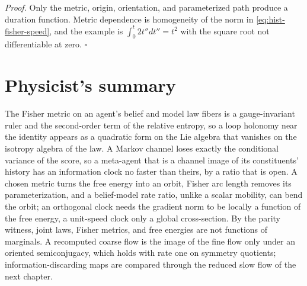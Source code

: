 \noindent\emph{Proof.}
Only the metric, origin, orientation, and parameterized path produce a duration
function.  Metric dependence is homogeneity of the norm in \eqref{eq:hist-fisher-speed},
and the example is $\int_0^t2t''dt''=t^2$ with the square root not differentiable at
zero.  $\square$

\section*{Physicist's summary}

The Fisher metric on an agent's belief and model law fibers is a gauge-invariant ruler and
the second-order term of the relative entropy, so a loop holonomy near the identity
appears as a quadratic form on the Lie algebra that vanishes on the isotropy algebra of
the law.  A Markov channel loses exactly the conditional variance of the score, so a
meta-agent that is a channel image of its constituents' history has an information clock
no faster than theirs, by a ratio that is open.  A chosen metric turns the free energy
into an orbit, Fisher arc length removes its parameterization, and a belief-model rate
ratio, unlike a scalar mobility, can bend the orbit; an orthogonal clock needs the
gradient norm to be locally a function of the free energy, a unit-speed clock only a
global cross-section.  By the parity witness, joint laws, Fisher metrics, and free
energies are not functions of marginals.  A recomputed coarse flow is the image of the
fine flow only under an oriented semiconjugacy, which holds with rate one on symmetry
quotients; information-discarding maps are compared through the reduced slow flow of the
next chapter.
